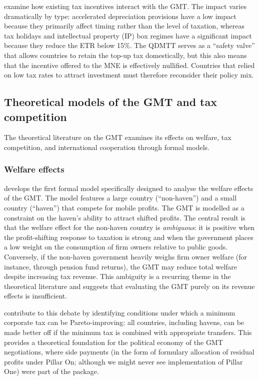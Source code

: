 \documentclass[11pt,a4paper]{article}
\begin{document}
\citet{liotti2022} examine how existing tax incentives interact with the GMT. The impact varies dramatically by type: accelerated depreciation provisions have a low impact because they primarily affect timing rather than the level of taxation, whereas tax holidays and intellectual property (IP) box regimes have a significant impact because they reduce the ETR below 15\%. The QDMTT serves as a ``safety valve'' that allows countries to retain the top-up tax domestically, but this also means that the incentive offered to the MNE is effectively nullified. Countries that relied on low tax rates to attract investment must therefore reconsider their policy mix.

\subsection{Theoretical models of the GMT and tax competition}\label{sec:theory}

The theoretical literature on the GMT examines its effects on welfare, tax competition, and international cooperation through formal models.

\subsubsection{Welfare effects}

\citet{Johannesen2022} develops the first formal model specifically designed to analyse the welfare effects of the GMT. The model features a large country (``non-haven'') and a small country (``haven'') that compete for mobile profits. The GMT is modelled as a constraint on the haven's ability to attract shifted profits. The central result is that the welfare effect for the non-haven country is \textit{ambiguous}: it is positive when the profit-shifting response to taxation is strong and when the government places a low weight on the consumption of firm owners relative to public goods. Conversely, if the non-haven government heavily weighs firm owner welfare (for instance, through pension fund returns), the GMT may reduce total welfare despite increasing tax revenue. This ambiguity is a recurring theme in the theoretical literature and suggests that evaluating the GMT purely on its revenue effects is insufficient.

\citet{hebous2023} contribute to this debate by identifying conditions under which a minimum corporate tax can be Pareto-improving: all countries, including havens, can be made better off if the minimum tax is combined with appropriate transfers. This provides a theoretical foundation for the political economy of the GMT negotiations, where side payments (in the form of formulary allocation of residual profits under Pillar On; although we might never see implementation of Pillar One) were part of the package.
\end{document}
